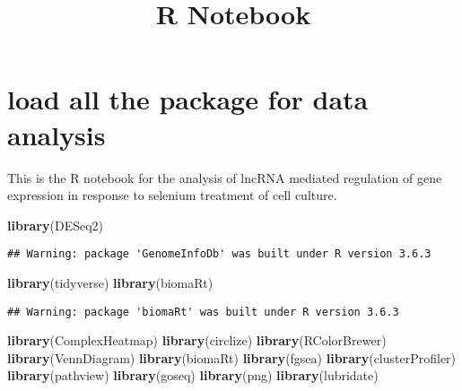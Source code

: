 \documentclass[]{article}
\title{R Notebook}
\author{}
\date{\vspace{-2.5em}}
\newenvironment{Shaded}{\begin{snugshade}}{\end{snugshade}}
\newcommand{\KeywordTok}[1]{\textcolor[rgb]{0.13,0.29,0.53}{\textbf{#1}}}
\newcommand{\NormalTok}[1]{#1}
\begin{document}
\maketitle

\hypertarget{load-all-the-package-for-data-analysis}{%
\section{load all the package for data
analysis}\label{load-all-the-package-for-data-analysis}}

This is the R notebook for the analysis of lncRNA mediated regulation of
gene expression in response to selenium treatment of cell culture.

\begin{Shaded}
\begin{Highlighting}[]
\KeywordTok{library}\NormalTok{(DESeq2)}
\end{Highlighting}
\end{Shaded}

\begin{verbatim}
## Warning: package 'GenomeInfoDb' was built under R version 3.6.3
\end{verbatim}

\begin{Shaded}
\begin{Highlighting}[]
\KeywordTok{library}\NormalTok{(tidyverse)}
\KeywordTok{library}\NormalTok{(biomaRt)}
\end{Highlighting}
\end{Shaded}

\begin{verbatim}
## Warning: package 'biomaRt' was built under R version 3.6.3
\end{verbatim}

\begin{Shaded}
\begin{Highlighting}[]
\KeywordTok{library}\NormalTok{(ComplexHeatmap)}
\KeywordTok{library}\NormalTok{(circlize)}
\KeywordTok{library}\NormalTok{(RColorBrewer)}
\KeywordTok{library}\NormalTok{(VennDiagram)}
\KeywordTok{library}\NormalTok{(biomaRt)}
\KeywordTok{library}\NormalTok{(fgsea)}
\KeywordTok{library}\NormalTok{(clusterProfiler)}
\KeywordTok{library}\NormalTok{(pathview)}
\KeywordTok{library}\NormalTok{(goseq)}
\KeywordTok{library}\NormalTok{(png)}
\KeywordTok{library}\NormalTok{(lubridate)}
\end{Highlighting}
\end{Shaded}
\end{document}
